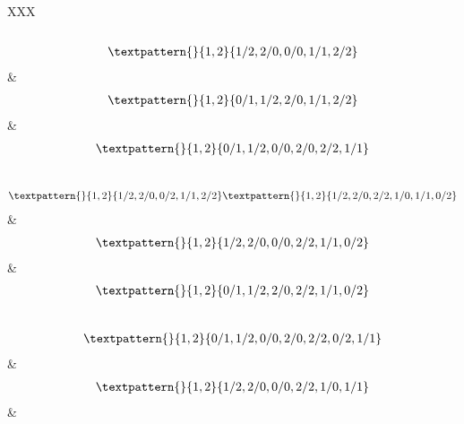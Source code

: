 \begin{center}
\begin{longtabu}[l]{XXX}
\begin{equation}
\end{equation}
\\
\begin{equation}
	\begin{gathered}
		\textpattern{}{1,2}{1/2,2/0,0/0,1/1,2/2}
	\end{gathered}
	\label{cls:134}
\end{equation}
&
\begin{equation}
	\begin{gathered}
		\textpattern{}{1,2}{0/1,1/2,2/0,1/1,2/2}
	\end{gathered}
	\label{cls:135}
\end{equation}
&
\begin{equation}
	\begin{gathered}
		\textpattern{}{1,2}{0/1,1/2,0/0,2/0,2/2,1/1}
	\end{gathered}
	\label{cls:136}
\end{equation}
\\
\begin{equation}
	\begin{gathered}
		\textpattern{}{1,2}{1/2,2/0,0/2,1/1,2/2}
		\textpattern{}{1,2}{1/2,2/0,2/2,1/0,1/1,0/2}
	\end{gathered}
	\label{cls:137}
\end{equation}
&
\begin{equation}
	\begin{gathered}
		\textpattern{}{1,2}{1/2,2/0,0/0,2/2,1/1,0/2}
	\end{gathered}
	\label{cls:138}
\end{equation}
&
\begin{equation}
	\begin{gathered}
		\textpattern{}{1,2}{0/1,1/2,2/0,2/2,1/1,0/2}
	\end{gathered}
	\label{cls:139}
\end{equation}
\\
\begin{equation}
	\begin{gathered}
		\textpattern{}{1,2}{0/1,1/2,0/0,2/0,2/2,0/2,1/1}
	\end{gathered}
	\label{cls:140}
\end{equation}
    &
\begin{equation}
	\begin{gathered}
		\textpattern{}{1,2}{1/2,2/0,0/0,2/2,1/0,1/1}
	\end{gathered}
	\label{cls:141}
\end{equation}
    &
\begin{equation}

\end{equation}
\end{longtabu}
\end{center}
